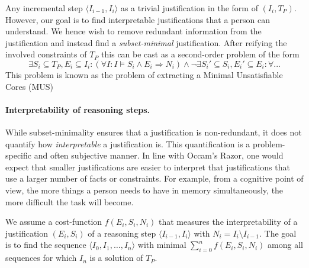 Any incremental step $\langle I_{i-1}, I_i \rangle$ as a trivial justification in the form of $(I_i, T_P)$. However, our goal is to find interpretable justifications that a person can understand. We hence wish to remove redundant information from the justification and instead find a \emph{subset-minimal} justification. After reifying the involved constraints of $T_P$ this can be cast as a second-order problem of the form
\[\exists S_i\subseteq T_P, E_i\subseteq I_i: (\forall I: I\models S_i\land E_i \Rightarrow N_i) \land \lnot \exists S_i'\subseteq S_i, E_i'\subseteq E_i: \forall ... \]
This problem is known as the problem of extracting a Minimal Unsatisfiable Cores (MUS) 


\paragraph{Interpretability of reasoning steps.}
While subset-minimality ensures that a justification is non-redundant, it does not quantify how \textit{interpretable} a justification is. 
This quantification is a problem-specific and often subjective manner. In line with Occam's Razor, one would expect that smaller justifications are easier to interpret that justifications that use a larger number of facts or constraints. For example, from a cognitive point of view, the more things a person needs to have in memory simultaneously, the more difficult the task will become. 

We assume a cost-function $f(E_i,S_i,N_i)$ that measures the interpretability of a justification $(E_i,S_i)$ of a reasoning step $\langle I_{i-1}, I_i \rangle$ with $N_i = I_i \setminus I_{i-1}$. The goal is to find the sequence $\langle I_0, I_1, \ldots, I_n \rangle$ with minimal $\sum_{i=0}^n f(E_i,S_i,N_i)$ among all sequences for which $I_n$ is a solution of $T_P$.

